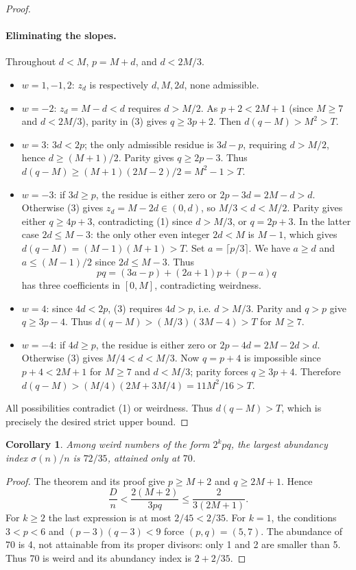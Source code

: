 \documentclass[11pt]{article}
\newtheorem*{corollary}{Corollary}
\begin{document}
\begin{proof}
\paragraph{Eliminating the slopes.} Throughout \(d<M\), \(p=M+d\), and \(d<2M/3\).

\begin{itemize}
\item \(w=1,-1,2\): \(z_d\) is respectively \(d,M,2d\), none admissible.
\item \(w=-2\): \(z_d=M-d<d\) requires \(d>M/2\). As \(p+2<2M+1\) (since \(M\ge7\) and \(d<2M/3\)), parity in (3) gives \(q\ge3p+2\). Then \(d(q-M)>M^2>T\).
\item \(w=3\): \(3d<2p\); the only admissible residue is \(3d-p\), requiring \(d>M/2\), hence \(d\ge(M+1)/2\). Parity gives \(q\ge2p-3\). Thus \(d(q-M)\ge (M+1)(2M-2)/2=M^2-1>T\).
\item \(w=-3\): if \(3d\ge p\), the residue is either zero or \(2p-3d=2M-d>d\). Otherwise (3) gives \(z_d=M-2d\in(0,d)\), so \(M/3<d<M/2\). Parity gives either \(q\ge4p+3\), contradicting (1) since \(d>M/3\), or \(q=2p+3\). In the latter case \(2d\le M-3\): the only other even integer \(2d<M\) is \(M-1\), which gives \(d(q-M)= (M-1)(M+1)>T\). Set \(a=\lceil p/3\rceil\). We have \(a\ge d\) and \(a\le (M-1)/2\) since \(2d\le M-3\). Thus
\[
 pq=(3a-p)+(2a+1)p+(p-a)q
\]
has three coefficients in \([0,M]\), contradicting weirdness.
\item \(w=4\): since \(4d<2p\), (3) requires \(4d>p\), i.e. \(d>M/3\). Parity and \(q>p\) give \(q\ge3p-4\). Thus \(d(q-M)>(M/3)(3M-4)>T\) for \(M\ge7\).
\item \(w=-4\): if \(4d\ge p\), the residue is either zero or \(2p-4d=2M-2d>d\). Otherwise (3) gives \(M/4<d<M/3\). Now \(q=p+4\) is impossible since \(p+4<2M+1\) for \(M\ge7\) and \(d<M/3\); parity forces \(q\ge3p+4\). Therefore \(d(q-M)>(M/4)(2M+3M/4)=11M^2/16>T\).

\end{itemize}
All possibilities contradict (1) or weirdness. Thus \(d(q-M)>T\), which is precisely the desired strict upper bound.
\end{proof}

\clearpage
\begin{corollary}
Among weird numbers of the form \(2^kpq\), the largest abundancy index \(\sigma(n)/n\) is \(72/35\), attained only at \(70\).
\end{corollary}
\begin{proof}
The theorem and its proof give \(p\ge M+2\) and \(q\ge2M+1\). Hence
\[
\frac{D}{n}<\frac{2(M+2)}{3pq}\le\frac{2}{3(2M+1)}.
\]
For \(k\ge2\) the last expression is at most \(2/45<2/35\). For \(k=1\), the conditions \(3<p<6\) and \((p-3)(q-3)<9\) force \((p,q)=(5,7)\). The abundance of 70 is 4, not attainable from its proper divisors: only 1 and 2 are smaller than 5. Thus 70 is weird and its abundancy index is \(2+2/35\).
\end{proof}
\end{document}
